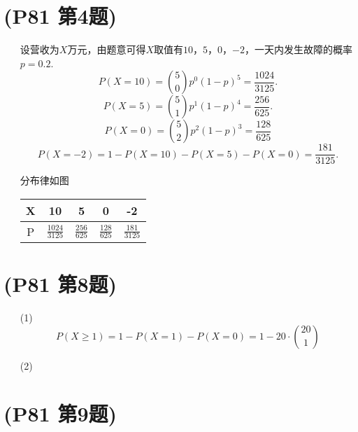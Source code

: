 \documentclass{article}
\begin{document}
\section{(P81 第4题)}  %
\begin{enumerate}
    \item []设营收为$X$万元，由题意可得$X$取值有$10$，$5$，$0$，$-2$，一天内发生故障的概率$p=0.2$.
    \[
        P(X=10)
        =\binom{5}{0} {p}^{0} {(1-p)}^{5} 
        =\frac{1024}{3125}.
    \]    
    \[
        P(X=5)
        =\binom{5}{1} {p}^{1} {(1-p)}^{4} 
        =\frac{256}{625}.   
    \]
    \[
        P(X=0)
        =\binom{5}{2} {p}^{2} {(1-p)}^{3} 
        =\frac{128}{625}   
    \]
    \[
        P(X=-2)
        =1-P(X=10)-P(X=5)-P(X=0)  
        =\frac{181}{3125}.  
    \]    
    \item []分布律如图
    \begin{table}[!ht]
        \centering
        \begin{tabular}{c|cccc}
            X & 10 & 5 & 0 & -2 \\ \hline
            P & $\displaystyle{\frac{1024}{3125}}$ & $\displaystyle{\frac{256}{625}}$ & $\displaystyle{\frac{128}{625}}$ & $\displaystyle{\frac{181}{3125}}$ 
        \end{tabular}
    \end{table}
\end{enumerate}

\section{(P81 第8题)}  %
\begin{enumerate}
    \item [(1)]
    \[
        P(X\geq 1)=1-P(X=1)-P(X=0)
        =1-20 \cdot \binom{20}{1}    
    \]
    \item [(2)]
\end{enumerate}

\section{(P81 第9题)}  %
\end{document}
